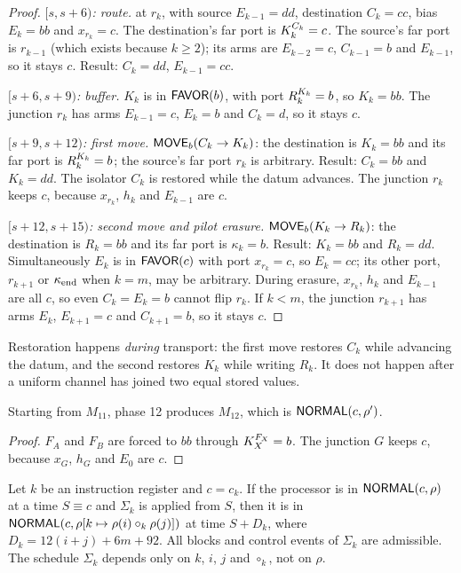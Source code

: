 \begin{proof}
\emph{$[s,s+6)$: route.}  at $r_k$, with source $E_{k-1}=dd$, destination $C_k=cc$,
bias $E_k=bb$ and $x_{r_k}=c$. The destination's far port is $K_k^{C_k}=c$. The source's far port
is $r_{k-1}$ (which exists because $k\ge 2$); its arms are $E_{k-2}=c$, $C_{k-1}=b$ and
$E_{k-1}$, so it stays $c$. Result: $C_k=dd$, $E_{k-1}=cc$.

\emph{$[s+6,s+9)$: buffer.} $K_k$ is in $\textsf{FAVOR}(b)$, with port $R_k^{K_k}=b$, so $K_k=bb$. The
junction $r_k$ has arms $E_{k-1}=c$, $E_k=b$ and $C_k=d$, so it stays $c$.

\emph{$[s+9,s+12)$: first move.} $\textsf{MOVE}_b(C_k\to K_k)$: the destination is $K_k=bb$ and its far
port is $R_k^{K_k}=b$; the source's far port $r_k$ is arbitrary. Result: $C_k=bb$ and $K_k=dd$.
The isolator $C_k$ is restored while the datum advances. The junction $r_k$ keeps $c$, because
$x_{r_k}$, $h_k$ and $E_{k-1}$ are $c$.

\emph{$[s+12,s+15)$: second move and pilot erasure.} $\textsf{MOVE}_b(K_k\to R_k)$: the destination is
$R_k=bb$ and its far port is $\kappa_k=b$. Result: $K_k=bb$ and $R_k=dd$. Simultaneously $E_k$ is in
$\textsf{FAVOR}(c)$ with port $x_{r_k}=c$, so $E_k=cc$; its other port, $r_{k+1}$ or $\kappa_{\mathrm{end}}$ when $k=m$, may be
arbitrary. During erasure, $x_{r_k}$, $h_k$ and $E_{k-1}$ are all $c$, so even $C_k=E_k=b$ cannot flip
$r_k$. If $k<m$, the junction $r_{k+1}$ has arms $E_k$, $E_{k+1}=c$ and $C_{k+1}=b$, so it stays $c$.
\end{proof}

Restoration happens \emph{during} transport: the first move restores $C_k$ while advancing the
datum, and the second restores $K_k$ while writing $R_k$. It does not happen after a uniform
channel has joined two equal stored values.

\begin{lemma}\label{lem:fronts}
Starting from $M_{11}$, phase 12 produces $M_{12}$, which is $\textsf{NORMAL}(c,\rho')$.
\end{lemma}

\begin{proof}
$F_A$ and $F_B$ are forced to $bb$ through $K_X^{F_X}=b$. The junction $G$ keeps $c$, because
$x_G$, $h_G$ and $E_0$ are $c$.
\end{proof}

\begin{proposition}\label{prop:instruction}
Let $k$ be an instruction register and $c=c_k$. If the processor is in $\textsf{NORMAL}(c,\rho)$ at a time
$S\equiv c$ and $\Sigma_k$ is applied from $S$, then it is in $\textsf{NORMAL}(c,\rho[k\mapsto
\rho(i)\circ_k\rho(j)])$ at time $S+D_k$, where $D_k=12(i+j)+6m+92$. All blocks and control events
of $\Sigma_k$ are admissible. The schedule $\Sigma_k$ depends only on $k$, $i$, $j$ and $\circ_k$,
not on $\rho$.
\end{proposition}

